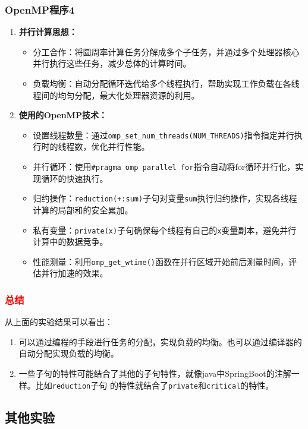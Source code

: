 \documentclass{article}
\begin{document}
\subsubsection{OpenMP程序4}
\begin{enumerate}
    \item \textbf{并行计算思想：}
    \begin{itemize}
        \item 分工合作：将圆周率计算任务分解成多个子任务，并通过多个处理器核心并行执行这些任务，减少总体的计算时间。
        \item 负载均衡：自动分配循环迭代给多个线程执行，帮助实现工作负载在各线程间的均匀分配，最大化处理器资源的利用。
    \end{itemize}
    
    \item \textbf{使用的OpenMP技术：}
    \begin{itemize}
        \item 设置线程数量：通过\texttt{omp\_set\_num\_threads(NUM\_THREADS)}指令指定并行执行时的线程数，优化并行性能。
        \item 并行循环：使用\texttt{\#pragma omp parallel for}指令自动将for循环并行化，实现循环的快速执行。
        \item 归约操作：\texttt{reduction(+:sum)}子句对变量\texttt{sum}执行归约操作，实现各线程计算的局部和的安全累加。
        \item 私有变量：\texttt{private(x)}子句确保每个线程有自己的\texttt{x}变量副本，避免并行计算中的数据竞争。
        \item 性能测量：利用\texttt{omp\_get\_wtime()}函数在并行区域开始前后测量时间，评估并行加速的效果。
    \end{itemize}
\end{enumerate}
\subsubsection{\textcolor{red}{\textbf{总结}}}
从上面的实验结果可以看出：
\begin{enumerate}
    \item 可以通过编程的手段进行任务的分配，实现负载的均衡。也可以通过编译器的自动分配实现负载的均衡。
    \item 一些子句的特性可能结合了其他的子句特性，就像java中SpringBoot的注解一样。比如\texttt{reduction}子句
    的特性就结合了\texttt{private}和\texttt{critical}的特性。
\end{enumerate}
\subsection{其他实验}
\end{document}
